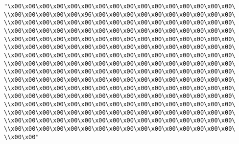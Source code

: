 \verb|"\x00\x00\x00\x00\x00\x00\x00\x00\x00\x00\x00\x00\x00\x00\x00\x00\|\newline
\verb|\\x00\x00\x00\x00\x00\x96\x00\x00\x00\x00\x00\x00\x00\x00\x00\x00\|\newline
\verb|\\x00\x00\x00\x00\x00\x00\x00\x00\x00\x00\x00\x00\x00\x00\x00\x00\|\newline
\verb|\\x00\x00\x00\x00\x00\x00\x00\x00\x00\x00\x00\x00\x00\x00\x00\x00\|\newline
\verb|\\x00\x00\x00\x00\x00\x00\x00\x00\x00\x00\x00\x00\x00\x00\x00\x00\|\newline
\verb|\\x00\x00\x00\x00\x00\x00\x00\x00\x00\x00\x00\x00\x00\x00\x00\x00\|\newline
\verb|\\x00\x00\x00\x00\x00\x00\x00\x00\x00\x00\x00\x00\x00\x00\x00\x00\|\newline
\verb|\\x00\x00\x00\x00\x00\x00\x00\x00\x00\x00\x00\x00\x00\x00\x00\x00\|\newline
\verb|\\x00\x00\x00\x00\x00\x00\x00\x00\x00\x00\x00\x00\x00\x00\x00\x00\|\newline
\verb|\\x00\x00\x00\x00\x00\x00\x00\x00\x00\x00\x00\x00\x00\x00\x00\x00\|\newline
\verb|\\x00\x00\x00\x00\x00\x00\x00\x00\x00\x00\x00\x00\x00\x00\x00\x00\|\newline
\verb|\\x00\x00\x00\x00\x00\x00\x00\x00\x00\x00\x00\x00\x00\x00\x00\x00\|\newline
\verb|\\x00\x00\x00\x00\x00\x00\x00\x00\x00\x00\x00\x00\x00\x00\x00\x00\|\newline
\verb|\\x00\x00\x00\x00\x00\x00\x00\x00\x00\x00\x00\x00\x00\x00\x00\x00\|\newline
\verb|\\x00\x00\x00\x00\x00\x00\x00\x00\x00\x00\x00\x00\x00\x00\x00\x00\|\newline
\verb|\\x00\x00\x00\x00\x00\x00\x00\x00\x00\x00\x00\x00\x00\x00\x00\x00\|\newline
\verb|\\x00\x00"|\newline
